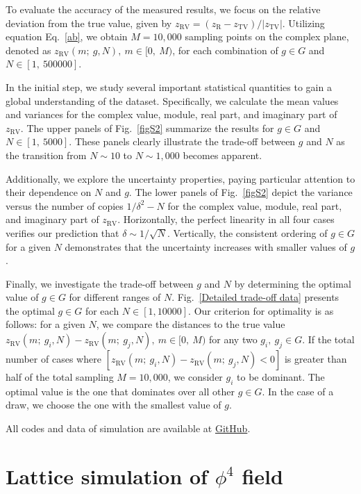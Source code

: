 \documentclass[twocolumn,pra,aps,superscriptaddress]{revtex4-2}
\begin{document}
To evaluate the accuracy of the measured results, we focus on the relative deviation from the true value, given by $z_{\text{RV}}=(z_{\text{R}}-z_{\text{TV}}) / |z_{\text{TV}}|$. Utilizing equation Eq.~\eqref{ab}, we obtain $M=10,000$ sampling points on the complex plane, denoted as ${ z_{\text{RV}}(m;~g, N),~m\in [0,~M) }$, for each combination of $g\in G$ and $N\in[1,~500000]$.

In the initial step, we study several important statistical quantities to gain a global understanding of the dataset. Specifically, we calculate the mean values and variances for the complex value, module, real part, and imaginary part of ${ z_{\text{RV}}}$. The upper panels of Fig.~\ref{figS2} summarize the results for $g\in G$ and $N\in[1,~5000]$. These panels clearly illustrate the trade-off between $g$ and $N$ as the transition from $N\sim10$ to $N \sim 1,000$ becomes apparent.

Additionally, we explore the uncertainty properties, paying particular attention to their dependence on $N$ and $g$. The lower panels of Fig.~\ref{figS2} depict the variance versus the number of copies $1/\delta^2-N$ for the complex value, module, real part, and imaginary part of ${ z_{\text{RV}} }$. Horizontally, the perfect linearity in all four cases verifies our prediction that $\delta \sim 1/\sqrt{N}$. Vertically, the consistent ordering of $g\in G$ for a given $N$ demonstrates that the uncertainty increases with smaller values of $g$.

Finally, we investigate the trade-off between $g$ and $N$ by determining the optimal value of $g\in G$ for different ranges of $N$. Fig.~\ref{Detailed trade-off data} presents the optimal $g\in G$ for each $N\in[1,10000]$. Our criterion for optimality is as follows: for a given $N$, we compare the distances to the true value ${ z_{\text{RV}}(m;~g_i, N)-z_{\text{RV}}(m;~g_j, N),~m\in [0,~M) }$ for any two $g_i,~g_j\in G$. If the total number of cases where $\left[ z_{\text{RV}}(m;~g_i, N)-z_{\text{RV}}(m;~g_j, N)<0 \right]$ is greater than half of the total sampling $M=10,000$, we consider $g_i$ to be dominant. The optimal value is the one that dominates over all other $g\in G$. In the case of a draw, we choose the one with the smallest value of $g$.

All codes and data of simulation are available at \href{https://github.com/GnefnAuy/GF-WV}{GitHub}.


\section{Lattice simulation of $\phi^4$ field}\label{LSPF}
\end{document}
